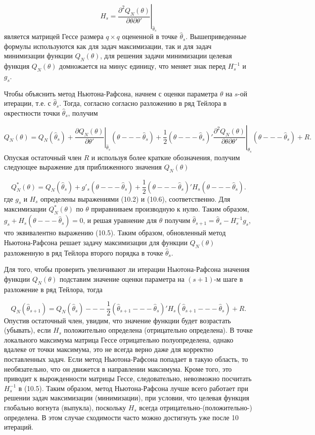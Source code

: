 \begin{equation}
H_s = \left. \dfrac{\partial^2Q_N(\theta)}{\partial\theta\partial\theta'}\right|_{\hat{\theta}_s}
\end{equation}
является матрицей Гессе размера $q{\times}q$ оцененной в точке $\hat{\theta}_s$. Вышеприведенные формулы используются как для задач максимизации, так и для задач минимизации функции $Q_N (\theta)$, для решения задачи минимизации целевая функция $Q_N (\theta)$ домножается на минус единицу, что меняет знак перед $H^{-1}_s$ и $g_s$.

Чтобы объяснить метод Ньютона-Рафсона, начнем  с оценки параметра $\theta$ на $s$-ой итерации, т.е. с $\hat{\theta}_s$. Тогда, согласно согласно разложению в ряд Тейлора в окрестности точки $\hat{\theta}_s$, получим

\[
Q_N(\theta) = \left. Q_N(\hat{\theta}_s)+\dfrac{\partial{Q_N(\theta)}}{\partial{\theta}'}\right|_{\hat{\theta}_s}(\theta --- \hat{\theta}_s)+\left. \dfrac{1}{2}(\theta --- \hat{\theta}_s)'
\dfrac{\partial^2{Q_N(\theta)}}{\partial{\theta}\partial{\theta}'}\right|_{\hat{\theta}_s}(\theta --- \hat{\theta}_s)+R.
\]
Опуская остаточный член $R$ и используя более краткие обозначения, получим следующее выражение для приближенного значения $Q_N(\theta)$

\[
Q^*_N(\theta) = Q_N(\hat{\theta}_s)+g'_s(\theta --- \hat{\theta}_s)+\dfrac{1}{2}(\theta --- \hat{\theta}_s)'H_s(\theta --- \hat{\theta}_s).
\]
где $g_s$ и $H_s$ определены выражениями (10.2) и (10.6), соответственно. Для максимизации $Q^*_N(\theta)$ по $\theta$ приравниваем производную к нулю. Таким образом, $g_s+H_s(\theta --- \hat{\theta}_s) = 0$, и решая уравнение для $\theta$ получим $\hat{\theta}_{s+1} = \hat{\theta}_s-H^{-1}_sg_s$, что эквивалентно выражению (10.5). Таким образом, обновленный метод Ньютона-Рафсона решает задачу максимизации для функции $Q_N(\theta)$ разложенную в ряд Тейлора второго порядка в точке $\hat{\theta}_s$.

Для того, чтобы проверить увеличивают ли итерации Ньютона-Рафсона значения функции $Q_N(\theta)$ подставим значение оценки параметра на $(s+1)$-м шаге в разложение в ряд Тейлора, тогда

\[
Q_N(\hat{\theta}_{s+1}) = Q_N(\hat{\theta}_s) --- \dfrac{1}{2}(\hat{\theta}_{s+1} --- \hat{\theta}_s)'H_s(\hat{\theta}_{s+1} --- \hat{\theta}_s)+R.
\]
Опустив остаточный член, увидим, что значение функции будет возрастать (убывать), если $H_s$ положительно определена (отрицательно определена). В точке локального максимума матрица Гессе отрицательно полуопределена, однако вдалеке от точки максимума, это не всегда верно даже для корректно поставленных задач. Если метод Ньютона-Рафсона попадает в такую область, то необязательно, что он движется в направлении максимума. Кроме того, это приводит к вырожденности матрицы Гессе, следовательно, невозможно посчитать $H^{-1}_s$ в (10.5). Таким образом, метод Ньютона-Рафсона лучше всего работает при решении задач максимизации (минимизации), при условии, что целевая функция глобально вогнута (выпукла), поскольку $H_s$ всегда отрицательно-(положительно-) определена. В этом случае сходимости часто можно достигнуть уже после 10 итераций.

